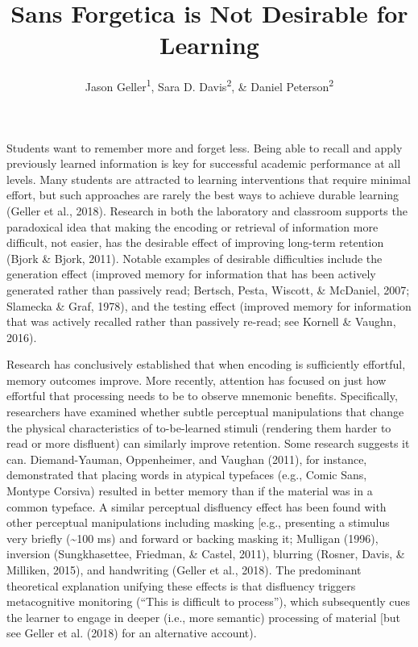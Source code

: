 \documentclass[
  english,
  jou]{apa6}
\author{Jason Geller\textsuperscript{1}, Sara D. Davis\textsuperscript{2}, \& Daniel Peterson\textsuperscript{2}}
\affiliation{
\vspace{0.5cm}
\textsuperscript{1} University of Iowa\\\textsuperscript{2} Skidmore College}
\title{Sans Forgetica is Not Desirable for Learning}
\date{}
\begin{document}
\maketitle

Students want to remember more and forget less. Being able to recall and apply previously learned information is key for successful academic performance at all levels. Many students are attracted to learning interventions that require minimal effort, but such approaches are rarely the best ways to achieve durable learning (Geller et al., 2018). Research in both the laboratory and classroom supports the paradoxical idea that making the encoding or retrieval of information more difficult, not easier, has the desirable effect of improving long-term retention (Bjork \& Bjork, 2011). Notable examples of desirable difficulties include the generation effect (improved memory for information that has been actively generated rather than passively read; Bertsch, Pesta, Wiscott, \& McDaniel, 2007; Slamecka \& Graf, 1978), and the testing effect (improved memory for information that was actively recalled rather than passively re-read; see Kornell \& Vaughn, 2016).

Research has conclusively established that when encoding is sufficiently effortful, memory outcomes improve. More recently, attention has focused on just how effortful that processing needs to be to observe mnemonic benefits. Specifically, researchers have examined whether subtle perceptual manipulations that change the physical characteristics of to-be-learned stimuli (rendering them harder to read or more disfluent) can similarly improve retention. Some research suggests it can. Diemand-Yauman, Oppenheimer, and Vaughan (2011), for instance, demonstrated that placing words in atypical typefaces (e.g., Comic Sans, Montype Corsiva) resulted in better memory than if the material was in a common typeface. A similar perceptual disfluency effect has been found with other perceptual manipulations including masking {[}e.g., presenting a stimulus very briefly (\textasciitilde100 ms) and forward or backing masking it; Mulligan (1996), inversion (Sungkhasettee, Friedman, \& Castel, 2011), blurring (Rosner, Davis, \& Milliken, 2015), and handwriting (Geller et al., 2018). The predominant theoretical explanation unifying these effects is that disfluency triggers metacognitive monitoring (\enquote{This is difficult to process}), which subsequently cues the learner to engage in deeper (i.e., more semantic) processing of material {[}but see Geller et al. (2018) for an alternative account).
\end{document}
